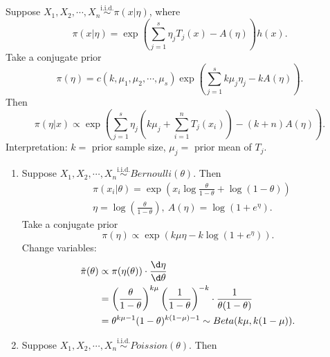 \documentclass[a4paper]{article}
\begin{document}
\begin{eg}
	Suppose $X_1,X_2,\cdots,X_n \stackrel{\text{i.i.d.}}{\sim} \pi (x|\eta)$, where
	\begin{equation*}
		\pi (x|\eta) = \exp\left(\sum\limits_{j=1}^s \eta_j T_j(x) - A(\eta)\right) h(x).
	\end{equation*}
	Take a conjugate prior
	\begin{equation*}
		\pi (\eta) = c(k,\mu_1,\mu_2,\cdots,\mu_s) \exp\left(\sum\limits_{j=1}^s k \mu_j \eta_j - k A(\eta)\right).
	\end{equation*}
	Then
	\begin{equation*}
		\pi (\eta | x) \propto \exp\left(\sum\limits_{j=1}^s \eta_j \left(k\mu_j + \sum\limits_{i=1}^n T_j(x_i)\right) - (k + n)A(\eta)\right).
	\end{equation*}
	Interpretation: $k = $ prior sample size, $\mu_j = $ prior mean of $T_j$.
	\begin{enumerate}
		\item Suppose $X_1,X_2,\cdots,X_n \stackrel{\text{i.i.d.}}{\sim} Bernoulli(\theta)$. Then
		\begin{equation*}
			\begin{aligned}
				& \pi (x_i|\theta) = \exp\left(x_i \log \frac{\theta}{1-\theta} + \log(1-\theta)\right) \\
				& \eta = \log\left(\frac{\theta}{1-\theta}\right), \ A(\eta) = \log(1+e^\eta).
			\end{aligned}	
		\end{equation*}
		Take a conjugate prior
		\begin{equation*}
			\pi (\eta) \propto \exp(k \mu \eta - k \log(1+e^\eta)).
		\end{equation*}
		Change variables: 
		\begin{equation}
			\begin{aligned}
				\tilde{\pi}(\theta) & \propto \pi(\eta(\theta)) \cdot \frac{\d \eta}{\d \theta} \\
				&= \left(\frac{\theta}{1 - \theta}\right)^{k \mu} \left(\frac{1}{1-\theta}\right) ^ {-k} \cdot \frac{1}{\theta(1-\theta)} \\
				& = \theta^{k \mu - 1} (1 - \theta) ^{k(1-\mu) - 1} \sim Beta(k \mu, k(1 - \mu)).
			\end{aligned}
		\end{equation}
		\item Suppose $X_1,X_2,\cdots,X_n \stackrel{\text{i.i.d.}}{\sim} Poission(\theta)$. Then
		\begin{equation*}
			\begin{aligned}

\end{aligned}
\end{equation*}
\end{enumerate}
\end{eg}
\end{document}
